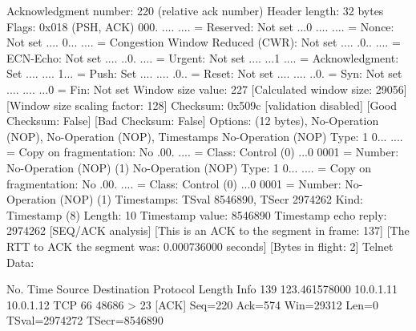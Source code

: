     Acknowledgment number: 220    (relative ack number)
    Header length: 32 bytes
    Flags: 0x018 (PSH, ACK)
        000. .... .... = Reserved: Not set
        ...0 .... .... = Nonce: Not set
        .... 0... .... = Congestion Window Reduced (CWR): Not set
        .... .0.. .... = ECN-Echo: Not set
        .... ..0. .... = Urgent: Not set
        .... ...1 .... = Acknowledgment: Set
        .... .... 1... = Push: Set
        .... .... .0.. = Reset: Not set
        .... .... ..0. = Syn: Not set
        .... .... ...0 = Fin: Not set
    Window size value: 227
    [Calculated window size: 29056]
    [Window size scaling factor: 128]
    Checksum: 0x509c [validation disabled]
        [Good Checksum: False]
        [Bad Checksum: False]
    Options: (12 bytes), No-Operation (NOP), No-Operation (NOP), Timestamps
        No-Operation (NOP)
            Type: 1
                0... .... = Copy on fragmentation: No
                .00. .... = Class: Control (0)
                ...0 0001 = Number: No-Operation (NOP) (1)
        No-Operation (NOP)
            Type: 1
                0... .... = Copy on fragmentation: No
                .00. .... = Class: Control (0)
                ...0 0001 = Number: No-Operation (NOP) (1)
        Timestamps: TSval 8546890, TSecr 2974262
            Kind: Timestamp (8)
            Length: 10
            Timestamp value: 8546890
            Timestamp echo reply: 2974262
    [SEQ/ACK analysis]
        [This is an ACK to the segment in frame: 137]
        [The RTT to ACK the segment was: 0.000736000 seconds]
        [Bytes in flight: 2]
Telnet
    Data: 

No.     Time           Source                Destination           Protocol Length Info
    139 123.461578000  10.0.1.11             10.0.1.12             TCP      66     48686 > 23 [ACK] Seq=220 Ack=574 Win=29312 Len=0 TSval=2974272 TSecr=8546890

